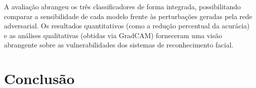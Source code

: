 \documentclass[12pt]{article}
\begin{document}
A avaliação abrangeu os três classificadores de forma integrada, possibilitando
comparar a sensibilidade de cada modelo frente às perturbações geradas pela
rede adversarial. Os resultados quantitativos (como a redução percentual da
acurácia) e as análises qualitativas (obtidas via GradCAM) forneceram uma visão
abrangente sobre as vulnerabilidades dos sistemas de reconhecimento facial.

\section{Conclusão}



\nocite{*}
\end{document}
